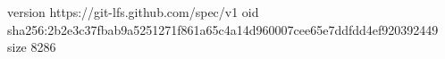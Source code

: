 version https://git-lfs.github.com/spec/v1
oid sha256:2b2e3c37fbab9a5251271f861a65c4a14d960007cee65e7ddfdd4ef920392449
size 8286
